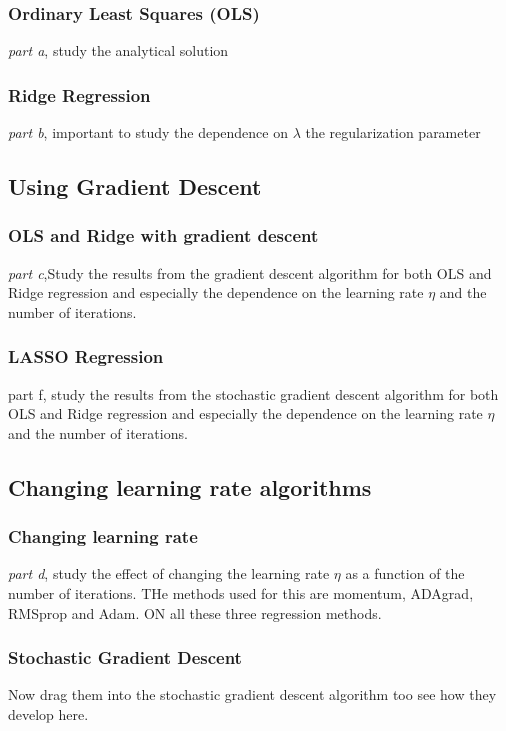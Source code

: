 \documentclass[amssymb,twocolumn,aps]{revtex4}
\begin{document}
\subsubsection{Ordinary Least Squares (OLS)}
\textit{part a}, study the analytical solution 

\subsubsection{Ridge Regression}
\textit{part b}, important to study the dependence on $\lambda$ the regularization parameter

\subsection{Using Gradient Descent}

\subsubsection{OLS and Ridge with gradient descent}
\textit{part c},Study the results from the gradient descent algorithm for both OLS and Ridge regression and especially the dependence on the learning rate $\eta$ and the number of iterations.

\subsubsection{LASSO Regression}
part f, study the results from the stochastic gradient descent algorithm for both OLS and Ridge regression and especially the dependence on the learning rate $\eta$ and the number of iterations.

\subsection{Changing learning rate algorithms}

\subsubsection{Changing learning rate}
\textit{part d}, study the effect of changing the learning rate $\eta$ as a function of the number of iterations. THe methods used for this are momentum, ADAgrad, RMSprop and Adam.
ON all these three regression methods.

\subsubsection{Stochastic Gradient Descent}
Now drag them into the stochastic gradient descent algorithm too see how they develop here.
\end{document}
